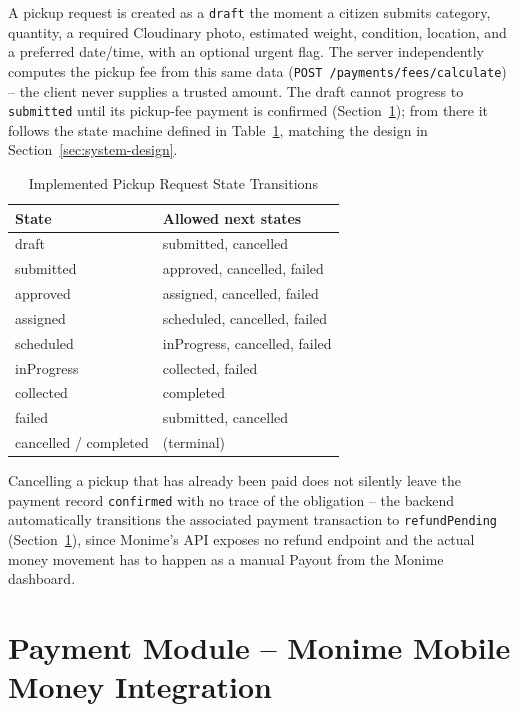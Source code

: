 A pickup request is created as a \texttt{draft} the moment a citizen submits
category, quantity, a required Cloudinary photo, estimated weight, condition,
location, and a preferred date/time, with an optional urgent flag. The server
independently computes the pickup fee from this same data
(\texttt{POST~/payments/fees/calculate}) -- the client never supplies a
trusted amount. The draft cannot progress to \texttt{submitted} until its
pickup-fee payment is confirmed (Section~\ref{sec:payment-module}); from
there it follows the state machine defined in
Table~\ref{tab:pickup-states-impl}, matching the design in
Section~\ref{sec:system-design}.

\begin{table}[H]
\centering
\small
\caption{Implemented Pickup Request State Transitions}
\label{tab:pickup-states-impl}
\begin{tabular}{@{}p{2.6cm}p{9.6cm}@{}}
\toprule
\textbf{State} & \textbf{Allowed next states} \\
\midrule
draft & submitted, cancelled \\
submitted & approved, cancelled, failed \\
approved & assigned, cancelled, failed \\
assigned & scheduled, cancelled, failed \\
scheduled & inProgress, cancelled, failed \\
inProgress & collected, failed \\
collected & completed \\
failed & submitted, cancelled \\
cancelled / completed & (terminal) \\
\bottomrule
\end{tabular}
\end{table}

Cancelling a pickup that has already been paid does not silently leave the
payment record \texttt{confirmed} with no trace of the obligation -- the
backend automatically transitions the associated payment transaction to
\texttt{refundPending} (Section~\ref{sec:payment-module}), since Monime's
API exposes no refund endpoint and the actual money movement has to
happen as a manual Payout from the Monime dashboard.

\section{Payment Module -- Monime Mobile Money Integration}
\label{sec:payment-module}

